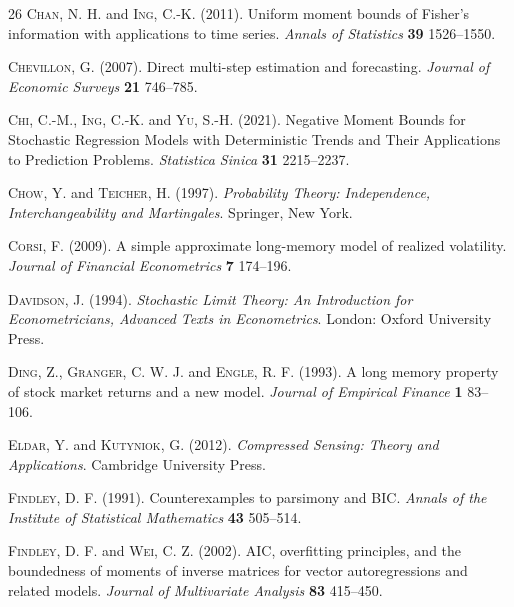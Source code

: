 \documentclass[ejsv2]{imsart}
\theoremstyle{plain}
\theoremstyle{definition}
\theoremstyle{remark}
\begin{document}
\begin{thebibliography}{26}
\textsc{Chan, N. H.} and \textsc{Ing, C.-K.} (2011). Uniform moment bounds of Fisher's information with applications to
  time series. \textit{Annals of Statistics}
\textbf{39} 1526--1550.

\textsc{Chevillon, G.} (2007). Direct multi-step estimation and forecasting. \textit{Journal of Economic Surveys}
\textbf{21} 746--785.

\textsc{Chi, C.-M.}, \textsc{Ing, C.-K.} and \textsc{Yu, S.-H.} (2021). Negative Moment Bounds for Stochastic Regression Models with
  Deterministic Trends and Their Applications to Prediction Problems. \textit{Statistica Sinica}
\textbf{31} 2215--2237.

\textsc{Chow, Y.} and \textsc{Teicher, H.} (1997). 
\textit{Probability Theory: Independence, Interchangeability and Martingales}. 
Springer, New York.

\textsc{Corsi, F.} (2009). A simple approximate long-memory model of realized volatility. \textit{Journal of Financial Econometrics} \textbf{7} 174--196.

\textsc{Davidson, J.} (1994). 
\textit{Stochastic Limit Theory: An Introduction for Econometricians, Advanced Texts in Econometrics}. 
London: Oxford University Press.

\textsc{Ding, Z.}, \textsc{Granger, C. W. J.} and \textsc{Engle, R. F.} (1993). A long memory property of stock market returns and a new model. \textit{Journal of Empirical Finance}
\textbf{1} 83--106.

\textsc{Eldar, Y.} and \textsc{Kutyniok, G.} (2012). 
\textit{Compressed Sensing: Theory and Applications}. 
Cambridge University Press.

\textsc{Findley, D. F.} (1991).
Counterexamples to parsimony and BIC.
\textit{Annals of the Institute of Statistical Mathematics}
\textbf{43} 505--514.

\textsc{Findley, D. F.} and \textsc{Wei, C. Z.} (2002). AIC, overfitting principles, and the boundedness of moments of inverse
  matrices for vector autoregressions and related models. \textit{Journal of Multivariate Analysis}
\textbf{83} 415--450.


\end{thebibliography}
\end{document}
